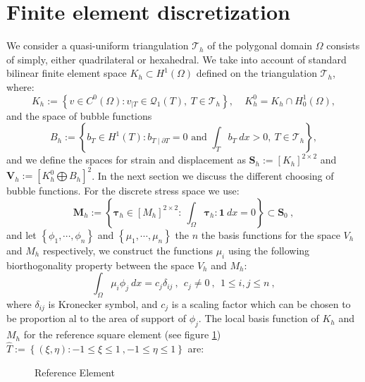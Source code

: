 \documentclass[preprint,12pt,authoryear]{elsarticle}
\begin{document}
\section{Finite element discretization}\label{sec:four}
We consider a quasi-uniform triangulation $\mathcal{T}_{h}$ of the polygonal domain $\Omega$ consists of simply, either quadrilateral or hexahedral.
We take into account of standard bilinear finite element space $K_{h}\subset H^{1}(\Omega)$ defined on the triangulation $\mathcal{T}_{h}$, where:
\begin{equation}
K_{h} := \left\lbrace v \in C^{0}(\Omega): v_{\mid T}\in \mathcal{Q}_{1}(T), \: T\in \mathcal{T}_{h} \right\rbrace ,
\:\:\:\:\: K_{h}^{0} = K_{h} \cap H_{0}^{1}(\Omega) ,
\end{equation} 
and the space of bubble functions
\begin{equation}
B_{h} := \left\lbrace b_{T}\in H^{1}(T): b_{T\mid \partial T}=0 
\mbox{ and } \int_{T} b_{T} \: dx > 0, \: T\in \mathcal{T}_{h} 
\right\rbrace ,
\end{equation}
and we define the spaces for strain and displacement as $\bm{S}_{h}:=[K_{h}]^{2\times 2}$ and $\bm{V}_{h}:=\left[K_{h}^{0} \bigoplus B_{h}\right]^{2}$. 
In the next section we discuss the different choosing of bubble functions.
For the discrete stress space we use:
\begin{equation}
\bm{M}_{h}:=\left\lbrace \bm{\tau}_{h}\in \left[M_{h}\right]^{2\times 2}: \: \int_{\Omega} \bm{\tau}_{h} : \bm{1} \: dx = 0 \right\rbrace \subset \bm{S}_{0}\:,
\end{equation}
and let $\left\lbrace \phi_{1}, \cdots, \phi_{n}\right\rbrace$ and 
$\left\lbrace \mu_{1}, \cdots, \mu_{n}\right\rbrace$ the $n$ the basis functions for the space $V_{h}$ and $M_{h}$ respectively, we construct the functions $\mu_{i}$ using the following biorthogonality property between the space $V_{h}$ and $M_{h}$:
\begin{equation} \label{eq:biorth_prop}
\int_{\Omega}\mu_{i}\phi_{j} \: dx = c_{j}\delta_{ij}\:, \:\: c_{j}\neq 0\:,
\:\: 1 \leq i,j \leq n \:,
\end{equation}
where $\delta_{ij}$ is Kronecker symbol, and $c_{j}$ is a scaling factor which can be chosen to be proportion al to the area of support of $\phi_{j}$.
The local basis function of $K_{h}$ and $M_{h}$ for the reference square element (see figure \ref{fig:ref_element}) $\hat{T}:=\left\lbrace (\xi,\eta): -1\leq \xi \leq 1 \:, -1\leq \eta \leq 1 \right\rbrace$ are:
\begin{figure}[h!]
\begin{center}

\caption{Reference Element \label{fig:ref_element}}
\end{center}
\end{figure}
\end{document}
